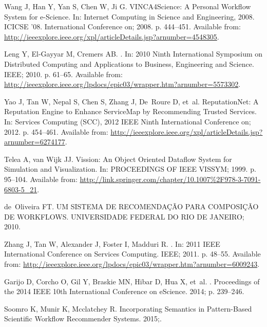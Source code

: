 \documentclass[10pt,letterpaper]{article}
\begin{document}
\begin{thebibliography}{10}
	Wang J, Han Y, Yan S, Chen W, Ji G.
	\newblock VINCA4Science: A Personal Workflow System for e-Science.
	\newblock In: Internet Computing in Science and Engineering, 2008. ICICSE '08.
	International Conference on; 2008. p. 444--451.
	\newblock Available from:
	\url{http://ieeexplore.ieee.org/xpl/articleDetails.jsp?arnumber=4548305}.
	
	Leng Y, El-Gayyar M, Cremers AB.
	.
	\newblock In: 2010 Ninth International Symposium on Distributed Computing and
	Applications to Business, Engineering and Science. IEEE; 2010. p. 61--65.
	\newblock Available from:
	\url{http://ieeexplore.ieee.org/lpdocs/epic03/wrapper.htm?arnumber=5573302}.
	
	Yao J, Tan W, Nepal S, Chen S, Zhang J, De~Roure D, et~al.
	\newblock ReputationNet: A Reputation Engine to Enhance ServiceMap by
	Recommending Trusted Services.
	\newblock In: Services Computing (SCC), 2012 IEEE Ninth International
	Conference on; 2012. p. 454--461.
	\newblock Available from:
	\url{http://ieeexplore.ieee.org/xpl/articleDetails.jsp?arnumber=6274177}.
	
	Telea A, van Wijk JJ.
	\newblock Vission: An Object Oriented Dataflow System for Simulation and
	Visualization.
	\newblock In: PROCEEDINGS OF IEEE VISSYM; 1999. p. 95--104.
	\newblock Available from:
	\url{http://link.springer.com/chapter/10.1007%2F978-3-7091-6803-5_21}.
		
		de~Oliveira FT.
		\newblock UM SISTEMA DE RECOMENDAÇÃO PARA COMPOSIÇÃO DE WORKFLOWS.
		\newblock UNIVERSIDADE FEDERAL DO RIO DE JANEIRO; 2010.
		
		Zhang J, Tan W, Alexander J, Foster I, Madduri R.
		.
		\newblock In: 2011 IEEE International Conference on Services Computing. IEEE;
		2011. p. 48--55.
		\newblock Available from:
		\url{http://ieeexplore.ieee.org/lpdocs/epic03/wrapper.htm?arnumber=6009243}.
		
		Garijo D, Corcho O, Gil Y, Braskie MN, Hibar D, Hua X, et~al.
		.
		\newblock Proceedings of the 2014 IEEE 10th International Conference on
		eScience. 2014; p. 239--246.
		
		Soomro K, Munir K, Mcclatchey R.
		\newblock Incorporating Semantics in Pattern-Based Scientific Workflow
		Recommender Systems. 2015;.
		

\end{thebibliography}
\end{document}
